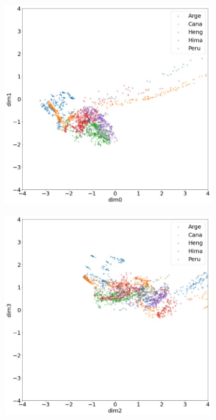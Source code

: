 \documentclass[a4paper, 12pt]{article}
\begin{document}
\begin{figure}
    \centering
    \begin{subfigure}[b]{0.475\textwidth}
        \centering
        \includegraphics[width=\textwidth]{fig/12a.jpg}
        \caption[]%
        {{\small}}
        \label{fig:14}
    \end{subfigure}
    \hfill
    \begin{subfigure}[b]{0.475\textwidth}
        \centering
        \includegraphics[width=\textwidth]{fig/12b.jpg}

\end{subfigure}
\end{figure}
\end{document}
